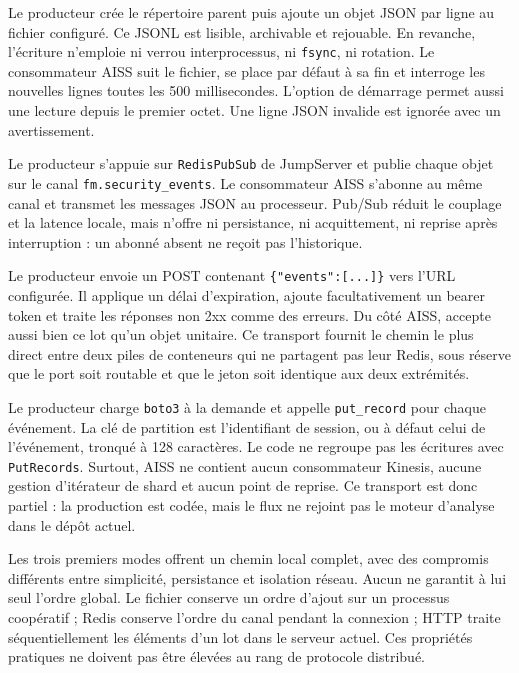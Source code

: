 \documentclass[11pt,a4paper,oneside]{report}
\theoremstyle{definition}
\theoremstyle{plain}
\begin{document}
\begin{description}[leftmargin=3.2cm,style=nextline]
\item[Fichier.] Le producteur crée le répertoire parent puis ajoute un objet
JSON par ligne au fichier configuré. Ce JSONL est lisible, archivable et
rejouable. En revanche, l'écriture n'emploie ni verrou interprocessus, ni
\texttt{fsync}, ni rotation. Le consommateur AISS suit le fichier, se place
par défaut à sa fin et interroge les nouvelles lignes toutes les
500 millisecondes. L'option de démarrage permet aussi une lecture depuis le
premier octet. Une ligne JSON invalide est ignorée avec un avertissement.

\item[Redis.] Le producteur s'appuie sur \texttt{RedisPubSub} de JumpServer et
publie chaque objet sur le canal \texttt{fm.security\_events}. Le consommateur
AISS s'abonne au même canal et transmet les messages JSON au processeur.
Pub/Sub réduit le couplage et la latence locale, mais n'offre ni persistance,
ni acquittement, ni reprise après interruption : un abonné absent ne reçoit
pas l'historique.

\item[HTTP.] Le producteur envoie un POST contenant
\texttt{\{"events":[...]\}} vers l'URL configurée. Il applique un délai
d'expiration, ajoute facultativement un bearer token et traite les réponses
non 2xx comme des erreurs. Du côté AISS,  accepte aussi bien ce
lot qu'un objet unitaire. Ce transport fournit le chemin le plus direct entre
deux piles de conteneurs qui ne partagent pas leur Redis, sous réserve que le
port soit routable et que le jeton soit identique aux deux extrémités.

\item[Kinesis.] Le producteur charge \texttt{boto3} à la demande et appelle
\texttt{put\_record} pour chaque événement. La clé de partition est
l'identifiant de session, ou à défaut celui de l'événement, tronqué à
128 caractères. Le code ne regroupe pas les écritures avec
\texttt{PutRecords}. Surtout, AISS ne contient aucun consommateur Kinesis,
aucune gestion d'itérateur de shard et aucun point de reprise. Ce transport
est donc partiel : la production est codée, mais le flux ne rejoint pas le
moteur d'analyse dans le dépôt actuel.
\end{description}

Les trois premiers modes offrent un chemin local complet, avec des compromis
différents entre simplicité, persistance et isolation réseau. Aucun ne
garantit à lui seul l'ordre global. Le fichier conserve un ordre d'ajout sur
un processus coopératif ; Redis conserve l'ordre du canal pendant la
connexion ; HTTP traite séquentiellement les éléments d'un lot dans le
serveur actuel. Ces propriétés pratiques ne doivent pas être élevées au rang
de protocole distribué.
\end{document}
